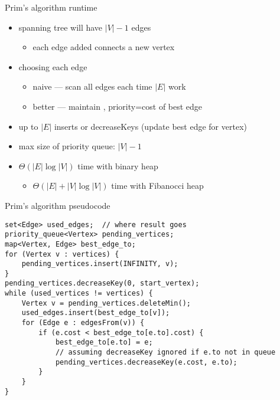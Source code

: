 \begin{frame}{Prim's algorithm runtime}
\begin{itemize}
    \item spanning tree will have $|V|-1$ edges
        \begin{itemize}
        \item each edge added connects a new vertex
        \end{itemize}
    \item choosing each edge 
        \begin{itemize}
        \item naive --- scan all edges each time $|E|$ work
        \item better --- maintain , priority=cost of best edge
        \end{itemize}
    \vspace{.5cm}
    \item up to $|E|$ inserts or decreaseKeys (update best edge for vertex)
    \item max size of priority queue: $|V|-1$
    \item $\Theta(|E|\log|V|)$ time with binary heap
        \begin{itemize}
            \item $\Theta(|E|+|V|\log|V|)$ time with Fibanocci heap
        \end{itemize}
\end{itemize}
\end{frame}


\begin{frame}[fragile,label=primPseudo]{Prim's algorithm pseudocode}
\lstset{language=C++,style=smaller}
\begin{lstlisting}
set<Edge> used_edges;  // where result goes
priority_queue<Vertex> pending_vertices;
map<Vertex, Edge> best_edge_to;
for (Vertex v : vertices) {
    pending_vertices.insert(INFINITY, v);
}
pending_vertices.decreaseKey(0, start_vertex);
while (used_vertices != vertices) {
    Vertex v = pending_vertices.deleteMin();
    used_edges.insert(best_edge_to[v]);
    for (Edge e : edgesFrom(v)) {
        if (e.cost < best_edge_to[e.to].cost) {
            best_edge_to[e.to] = e;
            // assuming decreaseKey ignored if e.to not in queue
            pending_vertices.decreaseKey(e.cost, e.to);
        }
    }
}
\end{lstlisting}
\end{frame}
